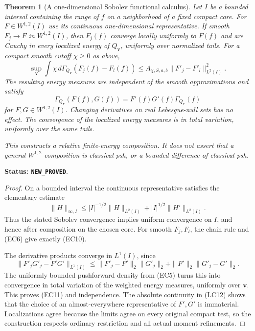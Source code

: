 \documentclass[11pt,a4paper]{article}
\numberwithin{equation}{section}
\newtheorem{theorem}{Theorem}[section]
\theoremstyle{definition}
\theoremstyle{remark}
\begin{document}
\begin{theorem}[A one-dimensional Sobolev functional calculus]
\label{thm:r11-sobolev-scalar-calculus}
Let $I$ be a bounded interval containing the range of $f$ on
a neighborhood of a fixed compact core.  For
$F\in W^{1,2}(I)$ use its continuous one-dimensional
representative.  If smooth $F_j\to F$ in $W^{1,2}(I)$,
then $F_j(f)$ converge locally uniformly to $F(f)$ and are
Cauchy in every localized energy of $Q_{\mathbf v}$,
uniformly over normalized tails.  For a compact smooth cutoff
$\chi\ge0$ as above,
\[
 \sup_{\mathbf v}
 \int\chi\,d\Gamma_{Q_{\mathbf v}}
                       (F_j(f)-F_l(f))
       \le A_{\chi,S,a,b}\|F'_j-F'_l\|_{L^2(I)}^2.
 \tag{EC10}
\]
The resulting energy measures are independent of the smooth
approximations and satisfy
\[
 \Gamma_{Q_{\mathbf v}}(F(f),G(f))
           =F'(f)G'(f)\Gamma_{Q_{\mathbf v}}(f)
 \tag{EC11}
\]
for $F,G\in W^{1,2}(I)$.  Changing derivatives on real
Lebesgue-null sets has no effect.  The convergence of the
localized energy measures is in total variation, uniformly
over the same tails.

This constructs a relative finite-energy composition.  It
does not assert that a general $W^{1,2}$ composition is
classical psh, or a bounded difference of classical psh.
\end{theorem}

\noindent\textbf{Status: \texttt{NEW\_PROVED}}.

\begin{proof}
On a bounded interval the continuous representative satisfies
the elementary estimate
\[
 \|H\|_{\infty,I}
 \le |I|^{-1/2}\|H\|_{L^2(I)}
                         +|I|^{1/2}\|H'\|_{L^2(I)}.
\]
Thus the stated Sobolev convergence implies uniform
convergence on $I$, and hence after composition on the
chosen core.  For smooth $F_j,F_l$, the chain rule and
(EC6) give exactly (EC10).

The derivative products converge in $L^1(I)$, since
\[
 \|F'_jG'_j-F'G'\|_{L^1(I)}
 \le\|F'_j-F'\|_2\|G'_j\|_2
                       +\|F'\|_2\|G'_j-G'\|_2.
\]
The uniformly bounded pushforward density from (EC5) turns
this into convergence in total variation of the weighted
energy measures, uniformly over $\mathbf v$.  This proves
(EC11) and independence.  The absolute continuity in (LC12)
shows that the choice of an almost-everywhere representative
of $F',G'$ is immaterial.  Localizations agree because the
limits agree on every original compact test, so the
construction respects ordinary restriction and all actual
moment refinements.
\end{proof}
\end{document}
